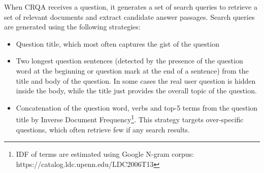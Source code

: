 When CRQA receives a question, it generates a set of search queries to retrieve a set of relevant documents and extract candidate answer passages.
Search queries are generated using the following strategies:
\begin{itemize}
\item Question title, which most often captures the gist of the question
\item Two longest question sentences (detected by the presence of the question word at the beginning or question mark at the end of a sentence) from the title and body of the question. In some cases the real user question is hidden inside the body, while the title just provides the overall topic of the question.
\item Concatenation of the question word, verbs and top-5 terms from the question title by Inverse Document Frequency\footnote{IDF of terms are estimated using Google N-gram corpus: https://catalog.ldc.upenn.edu/LDC2006T13}. This strategy targets over-specific questions, which often retrieve few if any search results.
\end{itemize}

